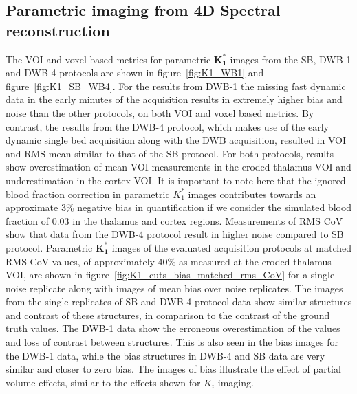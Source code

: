 \subsection{Parametric  imaging from 4D Spectral reconstruction}
The VOI and voxel based metrics for parametric $\boldsymbol{K_1^*}$ images from the SB, DWB-1 and DWB-4 protocols are shown in figure~\ref{fig:K1_WB1} and figure~\ref{fig:K1_SB_WB4}. For the results from DWB-1 the missing fast dynamic data in the early minutes of the acquisition results in extremely higher bias and noise than the other protocols, on both VOI and voxel based metrics. By contrast, the results from the DWB-4 protocol, which makes use of the early dynamic single bed acquisition along with the DWB acquisition, resulted in VOI and RMS mean similar to that of the SB protocol. For both protocols, results show overestimation of mean VOI measurements in the eroded thalamus VOI and underestimation in the cortex VOI. It is important to note here that the ignored blood fraction correction in parametric $K_1^*$ images contributes towards an approximate 3\% negative bias in quantification if we consider the simulated blood fraction of 0.03 in the thalamus and cortex regions.
Measurements of RMS CoV show that data from the DWB-4 protocol result in higher noise compared to SB protocol.
Parametric $\boldsymbol{K_1^*}$ images of the evaluated acquisition protocols at matched RMS CoV values, of approximately 40\% as measured at the eroded thalamus VOI, are shown in figure~\ref{fig:K1_cuts_bias_matched_rms_CoV} for a single noise replicate along with images of mean bias over noise replicates. The images from the single replicates of SB and DWB-4 protocol data show similar structures and contrast of these structures, in comparison to the contrast of the ground truth values. The DWB-1 data show the erroneous overestimation of the values and loss of contrast between structures. This is also seen in the bias images for the DWB-1 data, while the bias structures in DWB-4 and SB data are very similar and closer to zero bias. The images of bias illustrate the effect of partial volume effects, similar to the effects shown for $K_i$ imaging.


